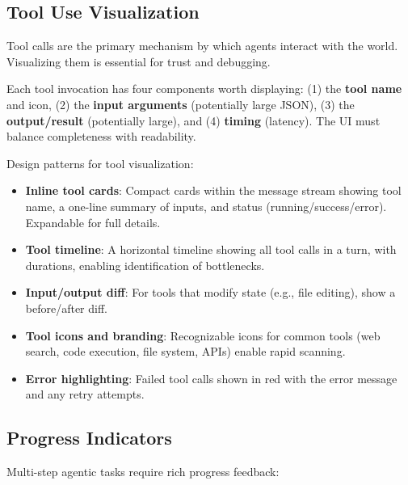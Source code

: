 \subsection{Tool Use Visualization}
\label{tool-use-visualization}

Tool calls are the primary mechanism by which agents interact with the world. Visualizing them is essential for trust and debugging.

\begin{keybox}
Each tool invocation has four components worth displaying: (1) the \textbf{tool name} and icon, (2) the \textbf{input arguments} (potentially large JSON), (3) the \textbf{output/result} (potentially large), and (4) \textbf{timing} (latency). The UI must balance completeness with readability.
\end{keybox}

Design patterns for tool visualization:

\begin{itemize}
  \item \textbf{Inline tool cards}: Compact cards within the message stream showing tool name, a one-line summary of inputs, and status (running/success/error). Expandable for full details.
  \item \textbf{Tool timeline}: A horizontal timeline showing all tool calls in a turn, with durations, enabling identification of bottlenecks.
  \item \textbf{Input/output diff}: For tools that modify state (e.g., file editing), show a before/after diff.
  \item \textbf{Tool icons and branding}: Recognizable icons for common tools (web search, code execution, file system, APIs) enable rapid scanning.
  \item \textbf{Error highlighting}: Failed tool calls shown in red with the error message and any retry attempts.
\end{itemize}

\subsection{Progress Indicators}
\label{progress-indicators}

Multi-step agentic tasks require rich progress feedback:

